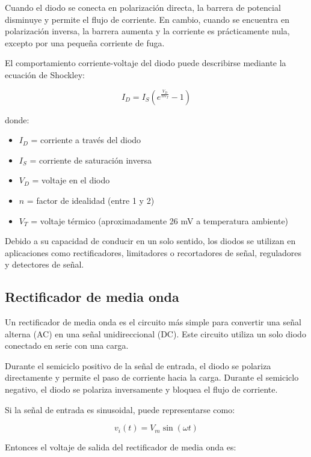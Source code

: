 \documentclass[journal]{IEEEtran}
\begin{document}
Cuando el diodo se conecta en polarización directa, la barrera de potencial disminuye y permite el flujo de corriente. En cambio, cuando se encuentra en polarización inversa, la barrera aumenta y la corriente es prácticamente nula, excepto por una pequeña corriente de fuga.

El comportamiento corriente-voltaje del diodo puede describirse mediante la ecuación de Shockley:

\begin{equation}
I_D = I_S \left( e^{\frac{V_D}{nV_T}} - 1 \right)
\end{equation}

donde:

\begin{itemize}
\item $I_D$ = corriente a través del diodo
\item $I_S$ = corriente de saturación inversa
\item $V_D$ = voltaje en el diodo
\item $n$ = factor de idealidad (entre 1 y 2)
\item $V_T$ = voltaje térmico (aproximadamente 26 mV a temperatura ambiente)
\end{itemize}

Debido a su capacidad de conducir en un solo sentido, los diodos se utilizan en aplicaciones como rectificadores, limitadores o recortadores de señal, reguladores y detectores de señal.

\subsection{Rectificador de media onda}

Un rectificador de media onda es el circuito más simple para convertir una señal alterna (AC) en una señal unidireccional (DC). Este circuito utiliza un solo diodo conectado en serie con una carga.

Durante el semiciclo positivo de la señal de entrada, el diodo se polariza directamente y permite el paso de corriente hacia la carga. Durante el semiciclo negativo, el diodo se polariza inversamente y bloquea el flujo de corriente.

Si la señal de entrada es sinusoidal, puede representarse como:

\begin{equation}
v_i(t) = V_m \sin(\omega t)
\label{eq:sin}
\end{equation}

Entonces el voltaje de salida del rectificador de media onda es:
\end{document}
